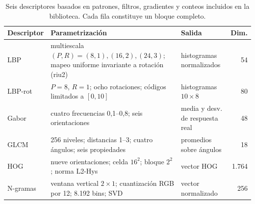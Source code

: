 \documentclass[a4paper,fleqn]{cas-sc}
\begin{document}
\begin{table}[pos=htbp]
\centering
\caption{Seis descriptores basados en patrones, filtros, gradientes y conteos incluidos en la biblioteca. Cada fila constituye un bloque completo.}
\label{tab:extractores-clasicos}
\small
\begin{tabular}{@{}lp{7.0cm}p{3.2cm}r@{}}
\toprule
Descriptor & Parametrización & Salida & Dim. \\
\midrule
LBP & multiescala $(P,R)=(8,1),(16,2),(24,3)$; mapeo uniforme invariante a rotación (riu2) & histogramas normalizados & 54 \\
LBP-rot & $P=8$, $R=1$; ocho rotaciones; códigos limitados a $[0,10]$ & histogramas $10\times 8$ & 80 \\
Gabor & cuatro frecuencias 0,1--0,8; seis orientaciones & media y desv. de respuesta real & 48 \\
GLCM & 256 niveles; distancias 1--3; cuatro ángulos; seis propiedades & promedios sobre ángulos & 18 \\
HOG & nueve orientaciones; celda $16^2$; bloque $2^2$; norma L2-Hys & vector HOG & 1.764 \\
N-gramas & ventana vertical $2\times1$; cuantización RGB por 12; 8.192 bins; SVD & vector normalizado & 256 \\
\bottomrule
\end{tabular}
\end{table}
\end{document}
